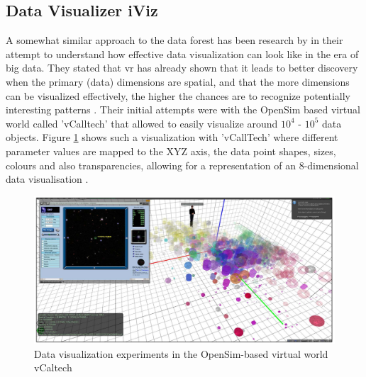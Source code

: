 
\subsection{Data Visualizer iViz}

A somewhat similar approach to the data forest has been research by \cite{Donalek2014} in their attempt to understand how effective data visualization can look like in the era of big data. They stated that \gls{vr} has already shown that it leads to better discovery when the primary (data) dimensions are spatial, and that the more dimensions can be visualized effectively, the higher the chances are to recognize potentially interesting patterns \citep{Donalek2014}. Their initial attempts were with the OpenSim based virtual world called 'vCalltech' that allowed \cite{Donalek2014} to easily visualize around $10^{4}$ - $10^{5}$ data objects. Figure \ref{fig:caltechsim} shows such a visualization with 'vCallTech' where different parameter values are mapped to the XYZ axis, the data point shapes, sizes, colours and also transparencies, allowing for a representation of an 8-dimensional data visualisation \citep{Donalek2014}.
\begin{figure}[t]
	\begin{center}
		\includegraphics[width=14cm]{03_Figures/05_LitReview/Donalek2014_Caltech.png}
		\caption[Data visualization experiments in the OpenSim-based virtual world vCaltech]{Data visualization experiments in the OpenSim-based virtual world vCaltech \citep{Donalek2014}}
		\label{fig:caltechsim}
	\end{center}
\end{figure}

